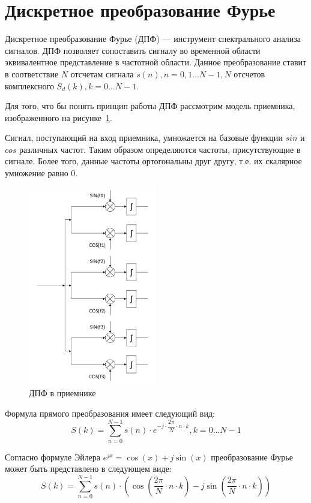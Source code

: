 \section{Дискретное преобразование Фурье}
Дискретное преобразование Фурье (ДПФ) --- инструмент спектрального анализа сигналов. ДПФ позволяет сопоставить сигналу во временной области эквивалентное представление в частотной области.
Данное преобразование ставит в соответствие \(N\) отсчетам сигнала \(s(n), n = 0, 1 \dots N-1,  N\) отсчетов комплексного \(S_d(k), k = 0 \dots N-1 \).

Для того, что бы понять принцип работы ДПФ рассмотрим модель приемника, изображенного на
рисунке~\ref{fig:vol_recieverDFT}.

Сигнал, поступающий на вход приемника, умножается на базовые функции \(sin\) и \(cos\) различных
частот. Таким образом определяются частоты, присутствующие в сигнале. Более того, данные частоты
ортогональны друг другу, т.е. их скалярное умножение равно 0.
\begin{figure}[H]
    \centering
    \includegraphics[width=0.5\textwidth]{img/vol_recieverDFT}
    \caption{ДПФ в приемнике}
    \label{fig:vol_recieverDFT}
\end{figure}

Формула прямого преобразования имеет следующий вид:
\begin{equation}
    S(k) = \sum_{n=0}^{N-1} s(n) \cdot e^{-j \cdot \dfrac{2\pi}{N} \cdot n \cdot k}, k = 0 \dots N-1
\end{equation}

Согласно формуле Эйлера \(e^{jx} = \cos(x) + j\sin(x)\) преобразование Фурье может быть представлено в следующем виде:
\begin{equation} \label{eq:DFT_cos}
    S(k) = \sum_{n=0}^{N-1} s(n) \cdot (\cos(\dfrac{2\pi}{N} \cdot n \cdot k) - j \sin(\dfrac{2\pi}{N} \cdot n \cdot k))
\end{equation}

